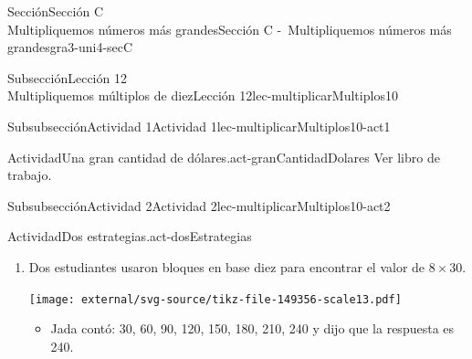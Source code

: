 \begin{sectionptx}{Sección}{{\Large Sección C\\}Multipliquemos números más grandes}{}{Sección C -~Multipliquemos números más grandes}{}{}{gra3-uni4-secC}
\begin{subsectionptx}{Subsección}{{\normalsize Lección 12\\[-0.05cm]}Multipliquemos múltiplos de diez}{}{Lección 12}{}{}{lec-multiplicarMultiplos10}
\begin{subsubsectionptx}{Subsubsección}{Actividad 1}{}{Actividad 1}{}{}{lec-multiplicarMultiplos10-act1}
\begin{activity}{Actividad}{Una gran cantidad de dólares.}{act-granCantidadDolares}
Ver libro de trabajo.
\end{activity}%
\end{subsubsectionptx}
%
%
\typeout{************************************************}
\typeout{************************************************}
%
\clearpage
\begin{subsubsectionptx}{Subsubsección}{Actividad 2}{}{Actividad 2}{}{}{lec-multiplicarMultiplos10-act2}
\begin{activity}{Actividad}{Dos estrategias.}{act-dosEstrategias}%
%
\begin{enumerate}
\item{}Dos estudiantes usaron bloques en base diez para encontrar el valor de \(8\times 30\).%
\begin{image}{0}{1}{0}{}%
\texttt{[image: external/svg-source/tikz-file-149356-scale13.pdf]}
\end{image}%
%
\begin{itemize}[label=\textbullet]
\item{}Jada contó: 30, 60, 90, 120, 150, 180, 210, 240 y dijo que la respuesta es 240.%

\end{itemize}
\end{enumerate}
\end{activity}
\end{subsubsectionptx}
\end{subsectionptx}
\end{sectionptx}
